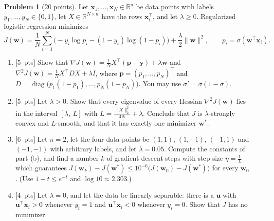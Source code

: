 \documentclass[11pt]{article}
\theoremstyle{definition}
\newtheorem{problem}{Problem}
\newcommand{\norm}[1]{\lVert #1 \rVert}
\newcommand{\pts}[1]{\textup{[#1~pts]}}
\DeclareMathOperator{\diag}{diag}
\begin{document}
\begin{problem}[20 points]\label{pr:fin-logistic}
    Let $\mathbf{x}_1, \ldots, \mathbf{x}_N \in \mathbb{R}^n$ be data points with labels $y_1, \ldots, y_N \in \{0, 1\}$, let $X \in \mathbb{R}^{N \times n}$ have the rows $\mathbf{x}_i^\top$, and let $\lambda \geq 0$. Regularized logistic regression minimizes
    \[J(\mathbf{w}) = \frac{1}{N}\sum_{i=1}^N \big(-y_i\log p_i - (1 - y_i)\log(1 - p_i)\big) + \frac{\lambda}{2}\norm{\mathbf{w}}^2, \qquad p_i = \sigma(\mathbf{w}^\top\mathbf{x}_i).\]
    \begin{enumerate}[label=(\alph*)]
        \item \pts{5} Show that $\nabla J(\mathbf{w}) = \frac{1}{N}X^\top(\mathbf{p} - \mathbf{y}) + \lambda\mathbf{w}$ and $\nabla^2 J(\mathbf{w}) = \frac{1}{N}X^\top DX + \lambda I$, where $\mathbf{p} = (p_1, \ldots, p_N)^\top$ and $D = \diag\big(p_1(1 - p_1), \ldots, p_N(1 - p_N)\big)$. You may use $\sigma' = \sigma(1 - \sigma)$.
        \item \pts{5} Let $\lambda > 0$. Show that every eigenvalue of every Hessian $\nabla^2 J(\mathbf{w})$ lies in the interval $[\lambda, \ L]$ with $L = \frac{\norm{X}_2^2}{4N} + \lambda$. Conclude that $J$ is $\lambda$-strongly convex and $L$-smooth, and that it has exactly one minimizer $\mathbf{w}^*$.
        \item \pts{6} Let $n = 2$, let the four data points be $(1, 1)$, $(1, -1)$, $(-1, 1)$ and $(-1, -1)$ with arbitrary labels, and let $\lambda = 0.05$. Compute the constants of part (b), and find a number $k$ of gradient descent steps with step size $\eta = \frac{1}{L}$ which guarantees $J(\mathbf{w}_k) - J(\mathbf{w}^*) \leq 10^{-6}\big(J(\mathbf{w}_0) - J(\mathbf{w}^*)\big)$ for every $\mathbf{w}_0$. (Use $1 - t \leq e^{-t}$ and $\log 10 \approx 2.303$.)
        \item \pts{4} Let $\lambda = 0$, and let the data be linearly separable: there is a $\mathbf{u}$ with $\mathbf{u}^\top\mathbf{x}_i > 0$ whenever $y_i = 1$ and $\mathbf{u}^\top\mathbf{x}_i < 0$ whenever $y_i = 0$. Show that $J$ has no minimizer.
    \end{enumerate}
\end{problem}
\end{document}
